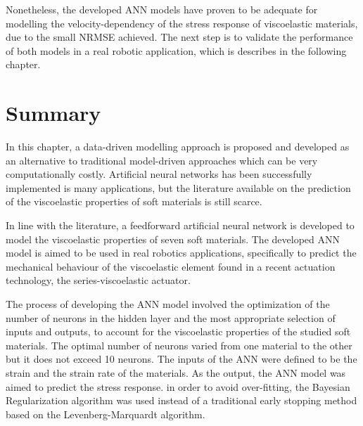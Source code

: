 Nonetheless, the developed ANN models have proven to be adequate for modelling the velocity-dependency of the stress response of viscoelastic materials, due to the small NRMSE achieved. The next step is to validate the performance of both models in a real robotic application, which is describes in the following chapter.

\section{Summary}


In this chapter, a data-driven modelling approach is proposed and developed as an alternative to traditional model-driven approaches which can be very computationally costly. Artificial neural networks has been successfully implemented is many applications, but the literature available on the prediction of the viscoelastic properties of soft materials is still scarce. 

In line with the literature, a feedforward artificial neural network is developed to model the viscoelastic properties of seven soft materials. The developed ANN model is aimed to be used in real robotics applications, specifically to predict the mechanical behaviour of the viscoelastic element found in a recent actuation technology, the series-viscoelastic actuator.

The process of developing the ANN model involved the optimization of the number of neurons in the hidden layer and the most appropriate selection of inputs and outputs, to account for the viscoelastic properties of the studied soft materials. The optimal number of neurons varied from one material to the other but it does not exceed 10 neurons. The inputs of the ANN were defined to be the strain and the strain rate of the materials. As the output, the ANN model was aimed to predict the stress response. in order to avoid over-fitting, the Bayesian Regularization algorithm was used instead of a traditional early stopping method based on the Levenberg-Marquardt algorithm.

